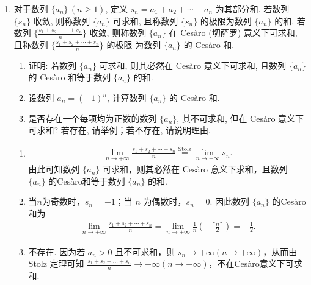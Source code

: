 \begin{enumerate}
    \item[11.]对于数列 $\{a_{n}\}\, (n \geq 1)$, 定义 $s_{n} = a_{1} + a_{2} + \cdots + a_{n}$ 
    为其部分和. 若数列 $\{s_{n}\}$ 收敛, 则称数列 $\{a_{n}\}$ 可求和, 且称数列 $\{s_{n}\}$ 的极限为数列 
    $\{a_{n}\}$ 的和. 若数列 $\displaystyle\biggl\{ \frac{s_{1} + s_{2} + \cdots + s_{n}}{n} \biggr\}$ 收敛, 则称数列 $\{a_{n}\}$ 
    在 Cesàro (切萨罗) 意义下可求和, 且称数列 $\displaystyle\biggl\{\frac{s_{1} + s_{2} + \cdots + s_{n}}{n}\biggr\}$ 的极限
    为数列 $\{a_{n}\}$ 的 Cesàro 和.
    \begin{enumerate}
        \item[(a)]证明: 若数列 $\{a_{n}\}$ 可求和, 则其必然在 Cesàro 意义下可求和, 且数列 $\{a_{n}\}$ 的 Cesàro 和等于数列 $\{a_{n}\}$ 的和.
        \item[(b)]设数列 $\displaystyle a_{n} = (-1)^{n}$, 计算数列 $\{a_{n}\}$ 的 Cesàro 和.
        \item[(c)]是否存在一个每项均为正数的数列 $\{a_{n}\}$, 其不可求和, 但在 Cesàro 意义下可求和? 若存在, 请举例；若不存在, 请说明理由.
    \end{enumerate}
    \begin{solution}
        \begin{enumerate}
        \item[(a)] 
        \begin{equation*} 
            \begin{aligned}
        \lim_{n \to +\infty}\frac{s_{1}+s_{2}+\cdots+s_{n}}{n}
        \overset{\mathrm{Stolz}}{=}\lim_{n \to +\infty}s_{n}.
            \end{aligned}
        \end{equation*}
        由此可知数列 $\{a_{n}\}$ 可求和，则其必然在 Cesàro 意义下求和，且数列 $\{a_{n}\}$ 的Cesàro和等于数列 $\{a_{n}\}$ 的和.
        
        \item[(b)] 
        当$n$为奇数时，$s_{n}=-1$；当 $n$ 为偶数时，$s_{n}=0$.
        因此数列 $\{a_{n}\}$ 的Cesàro和为
        \begin{equation*} 
            \begin{aligned}
        \lim_{n \to +\infty}\frac{s_{1}+s_{2}+\cdots+s_{n}}{n}
        =\lim_{n \to +\infty}\frac{1}{n}(-\lceil\frac{n}{2}\rceil)=-\frac{1}{2}.
            \end{aligned}
        \end{equation*}
        
        \item[(c)] 
        不存在. 因为若 $a_{n}>0$ 且不可求和，则 $s_{n}\to +\infty(n\to+\infty)$，从而由 Stolz 定理可知 $\displaystyle\frac{s_{1}+s_{2}+...+s_{n}}{n}\to +\infty(n\to+\infty)$，不在Cesàro意义下可求和.
        \end{enumerate}
    \end{solution}


\end{enumerate}
